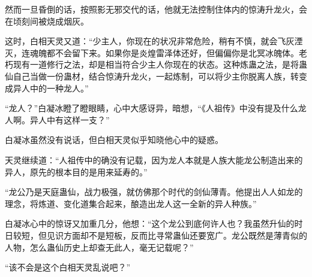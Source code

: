 \begin{this_body}
然而一旦昏倒的话，按照影无邪交代的话，他就无法控制住体内的惊涛升龙火，会在顷刻间被烧成烟灰。

这时，白相天灵又道：“少主人，你现在的状况非常危险，稍有不慎，就会飞灰湮灭，连魂魄都不会留下来。如果你是炎煌雷泽体还好，但偏偏你是北冥冰魄体。老朽现有一道修行之法，却是相当符合少主人你现在的状态。这种炼蛊之法，是将蛊仙自己当做一份蛊材，结合惊涛升龙火，一起炼制，可以将少主你脱离人族，转变成异人中的一种龙人。”

“龙人？”白凝冰瞪了瞪眼睛，心中大感讶异，暗想，“《人祖传》中没有提及什么龙人啊。异人中有这样一支？”

白凝冰虽然没有说话，但白相天灵似乎知晓他心中的疑惑。

天灵继续道：“人祖传中的确没有记载，因为龙人本就是人族大能龙公制造出来的异人，原先的根本目的是用来延寿的。”

“龙公乃是天庭蛊仙，战力极强，就仿佛那个时代的剑仙薄青。他提出人人如龙的理念，将炼道、变化道集合起来，酿造出龙人这一全新的异人种族。”

白凝冰心中的惊讶又加重几分，他想：“这个龙公到底何许人也？我虽然升仙的时日较短，但见识方面却不是短板，反而比寻常蛊仙还要宽广。龙公既然是薄青似的人物，怎么蛊仙历史上却查无此人，毫无记载呢？”

“该不会是这个白相天灵乱说吧？”

\end{this_body}

